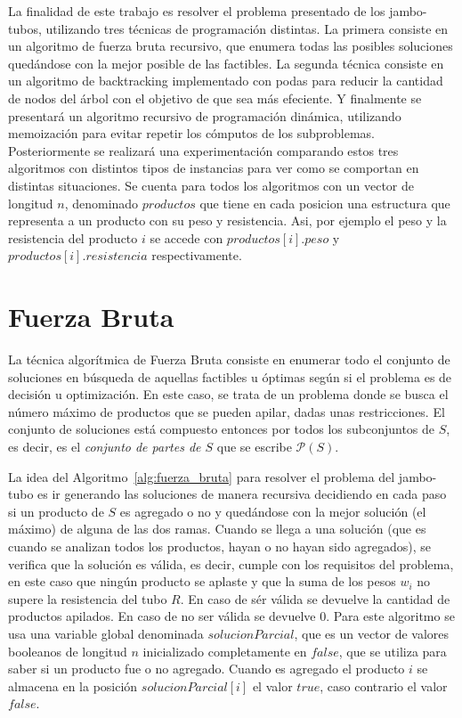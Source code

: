 \documentclass[10pt,a4paper]{article}
\begin{document}
La finalidad de este trabajo es resolver el problema presentado de los jambo-tubos, utilizando tres t\'ecnicas de programaci\'on distintas. La primera consiste en un algoritmo de fuerza bruta recursivo, que enumera todas las posibles soluciones qued\'andose con la mejor posible de las factibles. La segunda t\'ecnica consiste en un algoritmo de backtracking implementado con podas para reducir la cantidad de nodos del \'arbol con el objetivo de que sea m\'as efeciente. Y finalmente se presentar\'a un algoritmo recursivo de programaci\'on din\'amica, utilizando memoizaci\'on para evitar repetir los c\'omputos de los subproblemas. Posteriormente se realizará una experimentación comparando estos tres algoritmos con distintos tipos de instancias para ver como se comportan en distintas situaciones. Se cuenta para todos los algoritmos con un vector de longitud $n$, denominado $productos$ que tiene en cada posicion una estructura que representa a un producto con su peso y resistencia. Asi, por ejemplo el peso y la resistencia del producto $i$ se accede con $productos[i].peso$ y $productos[i].resistencia$ respectivamente.

\section{Fuerza Bruta} \label{sec:fuerza_bruta}
La t\'ecnica algorítmica de  Fuerza Bruta consiste en enumerar todo el conjunto de soluciones en búsqueda de aquellas factibles u óptimas según si el problema es de decisión u optimización. En este caso, se trata de un problema donde se busca el número máximo de productos que se pueden apilar, dadas unas restricciones. El conjunto de soluciones está compuesto entonces por todos los subconjuntos de $S$, es decir, es el \emph{conjunto de partes de $S$} que se escribe $\mathcal{P}(S)$.

La idea del Algoritmo~\ref{alg:fuerza_bruta} para resolver el problema del jambo-tubo es ir generando las soluciones de manera recursiva decidiendo en cada paso si un producto de $S$ es agregado o no y quedándose con la mejor solución (el máximo) de alguna de las dos ramas. Cuando se llega a una solución (que es cuando se analizan todos los productos, hayan o no hayan sido agregados), se verifica que la solución es válida, es decir, cumple con los requisitos del problema, en este caso que ningún producto se aplaste y que la suma de los pesos $w_i$ no supere la resistencia del tubo $R$. En caso de sér válida se devuelve la cantidad de productos apilados. En caso de no ser válida se devuelve 0. Para este algoritmo se usa una variable global denominada $solucionParcial$, que es un vector de valores booleanos de longitud $n$ inicializado completamente en $false$, que se utiliza para saber si un producto fue o no agregado. Cuando es agregado el producto $i$ se almacena en la posición $solucionParcial[i]$ el valor $true$, caso contrario el valor $false$.
\end{document}
